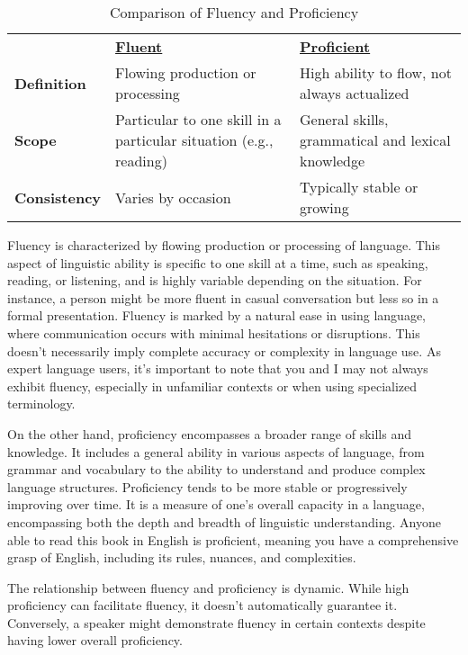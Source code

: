\setlength{\extrarowheight}{4pt} %
\begin{table}[ht]
\centering
\begin{tabular}{lp{}p{}}
 & \uline{\textbf{Fluent}} & \uline{\textbf{Proficient}} \\
\textbf{Definition} & Flowing production or processing & High ability to flow, not always actualized \\
\textbf{Scope} & Particular to one skill in a particular situation (e.g., reading) & General skills, grammatical and lexical knowledge \\
\textbf{Consistency} & Varies by occasion & Typically stable or growing \\
\end{tabular}
\caption{Comparison of Fluency and Proficiency}
\label{tab:fluency_proficiency}
\end{table}

Fluency is characterized by flowing production or processing of language. This aspect of linguistic ability is specific to one skill at a time, such as speaking, reading, or listening, and is highly variable depending on the situation. For instance, a person might be more fluent in casual conversation but less so in a formal presentation. Fluency is marked by a natural ease in using language, where communication occurs with minimal hesitations or disruptions. This doesn't necessarily imply complete accuracy or complexity in language use. As expert language users, it's important to note that you and I may not always exhibit fluency, especially in unfamiliar contexts or when using specialized terminology.

On the other hand, proficiency encompasses a broader range of skills and knowledge. It includes a general ability in various aspects of language, from grammar and vocabulary to the ability to understand and produce complex language structures. Proficiency tends to be more stable or progressively improving over time. It is a measure of one's overall capacity in a language, encompassing both the depth and breadth of linguistic understanding. Anyone able to read this book in English is proficient, meaning you have a comprehensive grasp of English, including its rules, nuances, and complexities.

The relationship between fluency and proficiency is dynamic. While high proficiency can facilitate fluency, it doesn't automatically guarantee it. Conversely, a speaker might demonstrate fluency in certain contexts despite having lower overall proficiency.

